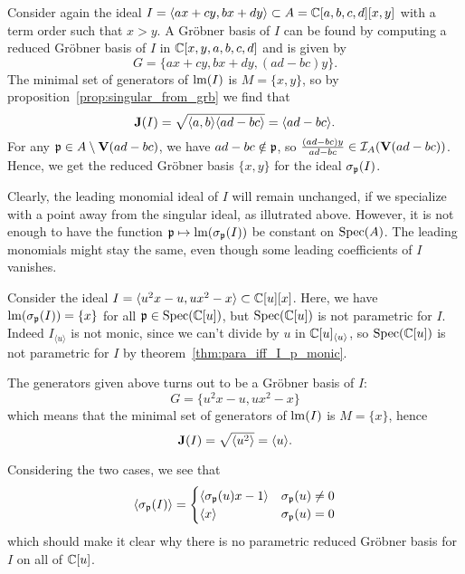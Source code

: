 \begin{example}\upshape
  Consider again the ideal $I = \langle ax + cy, bx + dy \rangle \subset A = \mathbb{C}[a, b, c, d][x, y]$ with a term order such that $x > y$. A Gröbner basis of $I$ can be found by computing a reduced Gröbner basis of $I$ in $\mathbb{C}[x, y, a, b, c, d]$ and is given by
  \[G = \{ax + cy, bx + dy, (ad - bc)y\}.\]
  The minimal set of generators of $\operatorname{lm}(I)$ is $M = \{x, y\}$, so by proposition~\ref{prop:singular_from_grb} we find that
  \[\operatorname{\mathbf J}(I) = \sqrt{\langle a, b \rangle \langle ad - bc \rangle} = \langle ad - bc \rangle.\]
  For any $\mathfrak p \in A \setminus \operatorname{\mathbf V}(ad - bc)$, we have $ad - bc \notin \mathfrak p$, so $\frac{(ad - bc)y}{ad - bc} \in \mathcal I_{A}(\operatorname{\mathbf V}(ad - bc))$. Hence, we get the reduced Gröbner basis $\{x, y\}$ for the ideal $\sigma_{\mathfrak p}(I)$.
\end{example}


Clearly, the leading monomial ideal of $I$ will remain unchanged, if we specialize with a point away from the singular ideal, as illutrated above. However, it is not enough to have the function $\mathfrak p \mapsto \operatorname{lm}(\sigma_{\mathfrak p}(I))$ be constant on $\operatorname{Spec}(A)$. The leading monomials might stay the same, even though some leading coefficients of $I$ vanishes.

\begin{example}\upshape
  Consider the ideal $I = \langle u^{2}x - u, ux^{2} - x \rangle \subset \mathbb{C}[u][x]$. Here, we have $\operatorname{lm}(\sigma_{\mathfrak p}(I)) = \{x\}$ for all $\mathfrak p \in \operatorname{Spec}(\mathbb{C}[u])$, but $\operatorname{Spec}(\mathbb{C}[u])$ is not parametric for $I$. Indeed $I_{\langle u \rangle}$ is not monic, since we can't divide by $u$ in $\mathbb{C}[u]_{\langle u \rangle}$, so $\operatorname{Spec}(\mathbb{C}[u])$ is not parametric for $I$ by theorem~\ref{thm:para_iff_I_p_monic}.

  The generators given above turns out to be a Gröbner basis of $I$:
  \[G = \{u^{2}x - u, ux^{2} - x\}\]
  which means that the minimal set of generators of $\operatorname{lm}(I)$ is $M = \{x\}$, hence
  \[\operatorname{\mathbf J}(I) = \sqrt{\langle u^{2} \rangle} = \langle u \rangle.\]

  Considering the two cases, we see that
  \[\langle \sigma_{\mathfrak p}(I) \rangle =
    \begin{cases}
      \langle \sigma_{\mathfrak p}(u)x - 1 \rangle & \sigma_{\mathfrak p}(u) \neq 0 \\
      \langle x \rangle & \sigma_{\mathfrak p}(u) = 0
    \end{cases}
  \]
  which should make it clear why there is no parametric reduced Gröbner basis for $I$ on all of $\mathbb{C}[u]$.
\end{example}

